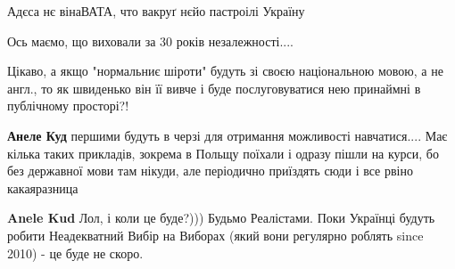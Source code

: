 \begin{itemize}
\begin{itemize}
\end{itemize}

 

Адєса нє вінаВАТА, что вакруґ нєйо пастроілі Україну

Ось маємо, що виховали за 30 років незалежності....

 

Цікаво, а якщо "нормальниє шіроти" будуть зі своєю національною мовою, а не
англ., то як швиденько він її вивче і буде послуговуватися нею принаймні в
публічному просторі?!

\begin{itemize}
 
\textbf{Анеле Куд} першими будуть в черзі для отримання можливості навчатися.... Має кілька таких прикладів, зокрема в Польщу поїхали і одразу пішли на курси, бо без державної мови там нікуди, але періодично приїздять сюди і все рвіно какаяразница

 
\textbf{Anele Kud} Лол, і коли це буде?))) Будьмо Реалістами. Поки Українці будуть робити Неадекватний Вибір на Виборах (який вони регулярно роблять since 2010) - це буде не скоро.
\end{itemize}

 


\end{itemize}
